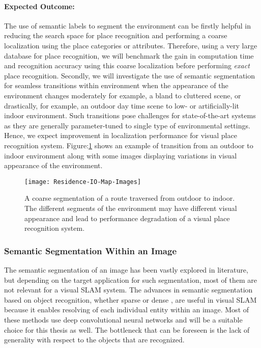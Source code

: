 \documentclass{article}
\begin{document}
\paragraph{Expected Outcome:}
The use of semantic labels to segment the environment can be firstly helpful in reducing the search space for place recognition and performing a coarse localization using the place categories or attributes. Therefore, using a very large database for place recognition, we will benchmark the gain in computation time and recognition accuracy using this coarse localization before performing \emph{exact} place recognition. Secondly, we will investigate the use of semantic segmentation for seamless transitions within environment when the appearance of the environment changes moderately for example, a bland to cluttered scene, or drastically, for example, an outdoor day time scene to low- or artificially-lit indoor environment. Such transitions pose challenges for state-of-the-art systems as they are generally parameter-tuned to single type of environmental settings. Hence, we expect improvement in localization performance for visual place recognition system. Figure:\ref{fig:semantic-across-example} shows an example of transition from an outdoor to indoor environment along with some images displaying variations in visual appearance of the environment.

\begin{figure}[htbp]
 \centering
 \texttt{[image: Residence-IO-Map-Images]}
 \caption{A coarse segmentation of a route traversed from outdoor to indoor. The different segments of the environment may have different visual appearance and lead to performance degradation of a visual place recognition system.}
 \label{fig:semantic-across-example}
\end{figure}

\subsubsection{Semantic Segmentation Within an Image}
The semantic segmentation of an image has been vastly explored in literature, but depending on the target application for such segmentation, most of them are not relevant for a visual SLAM system. The advances in semantic segmentation based on object recognition, whether sparse \cite{girshick2014rich} or dense \cite{long2015fully}, are useful in visual SLAM because it enables resolving of each individual entity within an image. Most of these methods use deep convolutional neural networks and will be a suitable choice for this thesis as well. The bottleneck that can be foreseen is the lack of generality with respect to the objects that are recognized. 
\end{document}
